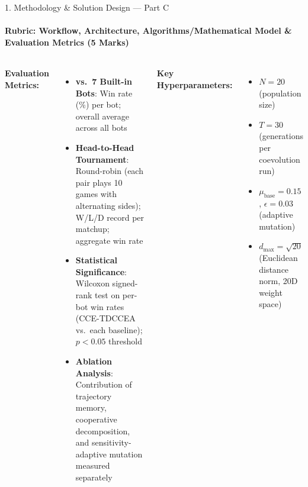 \documentclass[aspectratio=169, 11pt]{beamer}
\begin{document}
\begin{frame}{1. Methodology \& Solution Design --- Part C}
    \framesubtitle{Rubric: Workflow, Architecture, Algorithms/Mathematical Model \& Evaluation Metrics (5 Marks)}
    \footnotesize
    \begin{columns}[t]
        \textbf{Evaluation Metrics:}
        \begin{itemize}\footnotesize
            \item \textbf{vs.\ 7 Built-in Bots}: Win rate (\%) per bot; overall average across all bots
            \item \textbf{Head-to-Head Tournament}: Round-robin (each pair plays 10 games with alternating sides); W/L/D record per matchup; aggregate win rate
            \item \textbf{Statistical Significance}: Wilcoxon signed-rank test on per-bot win rates (CCE-TDCCEA vs.\ each baseline); $p{<}0.05$ threshold
            \item \textbf{Ablation Analysis}: Contribution of trajectory memory, cooperative decomposition, and sensitivity-adaptive mutation measured separately
        \end{itemize}
        
        \textbf{Key Hyperparameters:}
        \begin{itemize}\footnotesize
            \item $N{=}20$ (population size)
            \item $T{=}30$ (generations per coevolution run)
            \item $\mu_{\text{base}}{=}0.15$, $\epsilon{=}0.03$ (adaptive mutation)
            \item $d_{\max}{=}\sqrt{20}$ (Euclidean distance norm, 20D weight space)
        \end{itemize}
 
        \centering
    \end{columns}
\end{frame}
 
\end{document}
